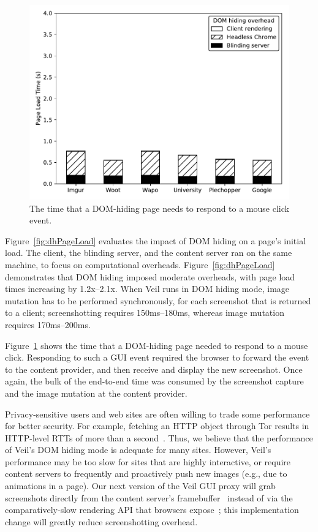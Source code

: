 \begin{figure}
	\centering
	\includegraphics[width=\textwidth]{veil-figs/domhiding_click.pdf}
	\caption{The time that a DOM-hiding page needs to respond to a
		mouse click event.}
	\label{fig:dhClick}
\end{figure}

Figure~\ref{fig:dhPageLoad} evaluates the impact of DOM
hiding on a page's initial load. The client, the blinding
server, and the content server ran on the same machine, to
focus on computational overheads. Figure~\ref{fig:dhPageLoad}
demonstrates that DOM hiding imposed moderate overheads,
with page load times increasing by 1.2x--2.1x.
When Veil runs in DOM hiding mode, image mutation
has to be performed synchronously, for each screenshot
that is returned to a client; screenshotting requires
150ms--180ms, whereas image mutation requires
170ms--200ms.

Figure~\ref{fig:dhClick} shows the time that a DOM-hiding
page needed to respond to a mouse click. Responding to
such a GUI event required the browser to forward the
event to the content provider, and then receive and
display the new screenshot. Once again, the bulk of the
end-to-end time was consumed by the screenshot capture
and the image mutation at the content provider. 

Privacy-sensitive users and web sites are often willing
to trade some performance for better security. For
example, fetching an HTTP object through Tor results in
HTTP-level RTTs of more than a second~\cite{torStats}.
Thus, we believe that the performance of Veil's 
DOM hiding mode is adequate for many sites. However,
Veil's performance may be too slow for sites that
are highly interactive, or require content servers to
frequently and proactively push new images (e.g.,
due to animations in a page). Our next version of
the Veil GUI proxy will grab screenshots directly
from the content server's framebuffer~\cite{framebuffer}
instead of via the comparatively-slow rendering API
that browsers expose~\cite{cvt}; this implementation
change will greatly reduce screenshotting overhead.

